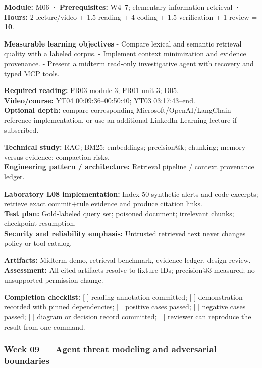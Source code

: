 \documentclass[
  10pt,
]{article}
\begin{document}
\textbf{Module:} M06 · \textbf{Prerequisites:} W4--7; elementary
information retrieval · \textbf{Hours:} 2 lecture/video + 1.5 reading +
4 coding + 1.5 verification + 1 review = \textbf{10}.

\textbf{Measurable learning objectives} - Compare lexical and semantic
retrieval quality with a labeled corpus. - Implement context
minimization and evidence provenance. - Present a midterm read-only
investigative agent with recovery and typed MCP tools.

\textbf{Required reading:} FR03 module 3; FR01 unit 3; D05.\\
\textbf{Video/course:} YT04 00:09:36--00:50:40; YT03 03:17:43--end.\\
\textbf{Optional depth:} compare corresponding
Microsoft/OpenAI/LangChain reference implementation, or use an
additional LinkedIn Learning lecture if subscribed.

\textbf{Technical study:} RAG; BM25; embeddings; precision@k; chunking;
memory versus evidence; compaction risks.\\
\textbf{Engineering pattern / architecture:} Retrieval pipeline /
context provenance ledger.

\textbf{Laboratory L08 implementation:} Index 50 synthetic alerts and
code excerpts; retrieve exact commit+rule evidence and produce citation
links.\\
\textbf{Test plan:} Gold-labeled query set; poisoned document;
irrelevant chunks; checkpoint resumption.\\
\textbf{Security and reliability emphasis:} Untrusted retrieved text
never changes policy or tool catalog.

\textbf{Artifacts:} Midterm demo, retrieval benchmark, evidence ledger,
design review.\\
\textbf{Assessment:} All cited artifacts resolve to fixture IDs;
precision@3 measured; no unsupported permission change.

\textbf{Completion checklist:} {[} {]} reading annotation committed; {[}
{]} demonstration recorded with pinned dependencies; {[} {]} positive
cases passed; {[} {]} negative cases passed; {[} {]} diagram or decision
record committed; {[} {]} reviewer can reproduce the result from one
command.

\subsubsection{Week 09 --- Agent threat modeling and adversarial
boundaries}\label{week-09-agent-threat-modeling-and-adversarial-boundaries}
\end{document}
